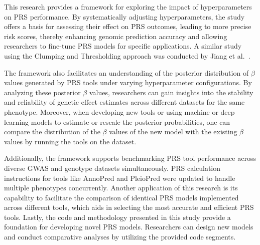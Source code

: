 \documentclass[pdflatex,sn-nature]{sn-jnl}%
\begin{document}
This research provides a framework for exploring the impact of hyperparameters on PRS performance. By systematically adjusting hyperparameters, the study offers a basis for assessing their effect on PRS outcomes, leading to more precise risk scores, thereby enhancing genomic prediction accuracy and allowing researchers to fine-tune PRS models for specific applications. A similar study using the Clumping and Thresholding approach was conducted by Jiang et al.~\cite{Jiang2023}.

The framework also facilitates an understanding of the posterior distribution of $\beta$ values generated by PRS tools under varying hyperparameter configurations. By analyzing these posterior $\beta$ values, researchers can gain insights into the stability and reliability of genetic effect estimates across different datasets for the same phenotype. Moreover, when developing new tools or using machine or deep learning models to estimate or rescale the posterior probabilities, one can compare the distribution of the $\beta$ values of the new model with the existing $\beta$ values by running the tools on the dataset.

Additionally, the framework supports benchmarking PRS tool performance across diverse GWAS and genotype datasets simultaneously. PRS calculation instructions for tools like AnnoPred and PleioPred were updated to handle multiple phenotypes concurrently. Another application of this research is its capability to facilitate the comparison of identical PRS models implemented across different tools, which aids in selecting the most accurate and efficient PRS tools. Lastly, the code and methodology presented in this study provide a foundation for developing novel PRS models. Researchers can design new models and conduct comparative analyses by utilizing the provided code segments.


 

 


\end{document}
